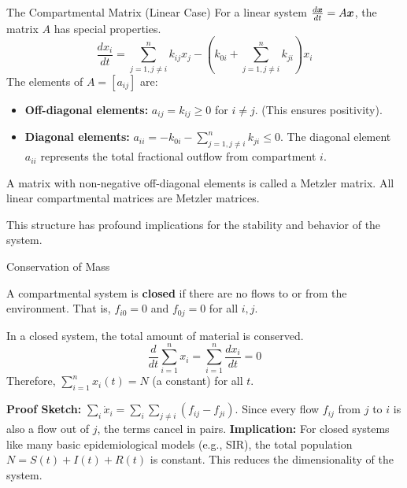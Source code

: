 \documentclass[aspectratio=169]{beamer}\usepackage[]{graphicx}\usepackage[]{xcolor}
\begin{document}
\begin{frame}{The Compartmental Matrix (Linear Case)}
    For a linear system $\frac{d\bm{x}}{dt} = A\bm{x}$, the matrix $A$ has special properties.
    $$ \frac{dx_i}{dt} = \sum_{j=1, j \neq i}^{n} k_{ij}x_j - \left(k_{0i} + \sum_{j=1, j \neq i}^{n} k_{ji}\right)x_i $$
    The elements of $A = [a_{ij}]$ are:
    \begin{itemize}
        \item \textbf{Off-diagonal elements:} $a_{ij} = k_{ij} \ge 0$ for $i \neq j$. (This ensures positivity).
        \item \textbf{Diagonal elements:} $a_{ii} = -k_{0i} - \sum_{j=1, j \neq i}^{n} k_{ji} \le 0$. The diagonal element $a_{ii}$ represents the total fractional outflow from compartment $i$.
    \end{itemize}
    \vfill
    \begin{definition}
        A matrix with non-negative off-diagonal elements is called a Metzler matrix. All linear compartmental matrices are Metzler matrices.
    \end{definition}
    This structure has profound implications for the stability and behavior of the system.
\end{frame}

\begin{frame}{Conservation of Mass}
    \begin{definition}
        A compartmental system is \textbf{closed} if there are no flows to or from the environment. That is, $f_{i0} = 0$ and $f_{0j} = 0$ for all $i, j$.
    \end{definition}
    \vfill
    \begin{theorem}
        In a closed system, the total amount of material is conserved.
        $$ \frac{d}{dt} \sum_{i=1}^n x_i = \sum_{i=1}^n \frac{dx_i}{dt} = 0 $$
        Therefore, $\sum_{i=1}^n x_i(t) = N$ (a constant) for all $t$.
    \end{theorem}
    \vfill
    \textbf{Proof Sketch:}
    $\sum_i \dot{x}_i = \sum_i \sum_{j \neq i} (f_{ij} - f_{ji})$. Since every flow $f_{ij}$ from $j$ to $i$ is also a flow out of $j$, the terms cancel in pairs.
    \vfill
    \textbf{Implication:} For closed systems like many basic epidemiological models (e.g., SIR), the total population $N = S(t) + I(t) + R(t)$ is constant. This reduces the dimensionality of the system.
\end{frame}
\end{document}
